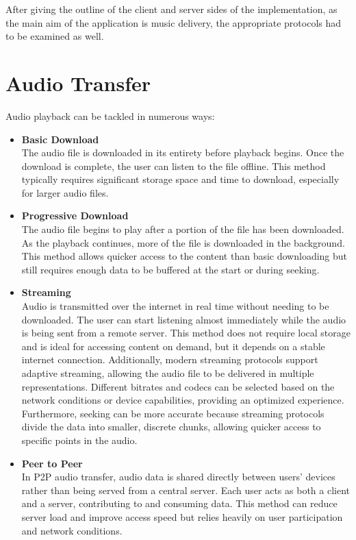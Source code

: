 After giving the outline of the client and server sides of the implementation,
as the main aim of the application is music delivery, the appropriate protocols had to be examined as well.


\section{Audio Transfer}
Audio playback can be tackled in numerous ways:

\begin{itemize}
    \item \textbf{Basic Download}\\
    The audio file is downloaded in its entirety before playback begins.
    Once the download is complete, the user can listen to the file offline.
    This method typically requires significant storage space and time to download,
    especially for larger audio files.

    \item \textbf{Progressive Download}\\
    The audio file begins to play after a portion of the file
    has been downloaded. As the playback continues, more of the file is downloaded
    in the background. This method allows quicker access to the content
    than basic downloading but still requires enough data to be buffered at the start or during seeking.

    \item \textbf{Streaming}\\
    Audio is transmitted over the internet in real time without needing
    to be downloaded. The user can start listening almost immediately while the audio is being
    sent from a remote server. This method does not require local storage and is
    ideal for accessing content on demand, but it depends on a stable internet connection.
    Additionally, modern streaming protocols support adaptive streaming, allowing the audio file
    to be delivered in multiple representations. Different bitrates and codecs can be
    selected based on the network conditions or device capabilities, providing an optimized experience.
    Furthermore, seeking can be more accurate because streaming protocols divide the data into
    smaller, discrete chunks, allowing quicker access to specific points in the audio.

    \item \textbf{Peer to Peer}\\
    In P2P audio transfer, audio data is shared directly between users'
    devices rather than being served from a central server.
    Each user acts as both a client and a server, contributing to and consuming
    data. This method can reduce server load and improve access speed but relies heavily on user participation and network conditions.
\end{itemize}

